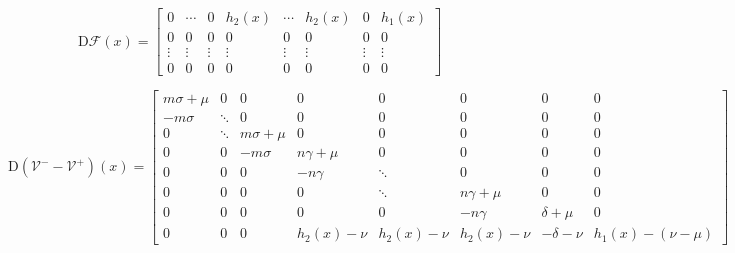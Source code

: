 \documentclass[fleqn]{article}
\begin{document}
\begin{equation*}
\mathrm{D}\mathcal{F}(x) =
\begin{bmatrix}
     0 & \cdots &      0 &  h_{2}(x) & \cdots &  h_{2}(x) &      0 &  h_{1}(x) \\
     0 &      0 &      0 &         0 &      0 &         0 &      0 &         0 \\
\vdots & \vdots & \vdots &    \vdots & \vdots &    \vdots & \vdots &    \vdots \\
     0 &      0 &      0 &         0 &      0 &         0 &      0 &         0
\end{bmatrix}
\end{equation*}

\begin{equation*}
\mathrm{D}(\mathcal{V}^{-} - \mathcal{V}^{+})(x) =
\begin{bmatrix}
 m\sigma+\mu &      0 &            0 &            0 &            0 &            0 &           0 &                  0 \\
-m\sigma     & \ddots &            0 &            0 &            0 &            0 &           0 &                  0 \\
           0 & \ddots &  m\sigma+\mu &            0 &            0 &            0 &           0 &                  0 \\
           0 &      0 & -m\sigma     &  n\gamma+\mu &            0 &            0 &           0 &                  0 \\
           0 &      0 &            0 & -n\gamma     &       \ddots &            0 &           0 &                  0 \\
           0 &      0 &            0 &            0 &       \ddots &  n\gamma+\mu &           0 &                  0 \\
           0 &      0 &            0 &            0 &            0 & -n\gamma     &  \delta+\mu &                  0 \\
           0 &      0 &            0 & h_{2}(x)-\nu & h_{2}(x)-\nu & h_{2}(x)-\nu & -\delta-\nu & h_{1}(x)-(\nu-\mu)
\end{bmatrix}
\end{equation*}

\clearpage
\end{document}
